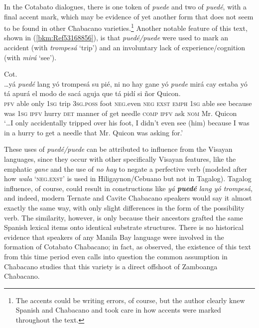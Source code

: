 \documentclass[output=paper,colorlinks,citecolor=brown]{langscibook}
\begin{document}
In the Cotabato dialogues, there is one token of \textit{puede} and two of \textit{puedé}, with a final accent mark, which may be evidence of yet another form that does not seem to be found in other Chabacano varieties.\footnote{The accents could be writing errors, of course, but the author clearly knew Spanish and Chabacano and took care in how accents were marked throughout the text.} Another notable feature of this text, shown in (\ref{bkm:Ref53168856}), is that \textit{puedé/puede} were used to mark an accident (with \textit{trompesá} ‘trip') and an involuntary lack of experience/cognition (with \textit{mirá} ‘see').

\ea
{\label{bkm:Ref53168856}Cot.}\\
\gll …yá \textit{puedé} lang yó trompesá su pié, ni no hay gane yó \textit{puede} mirá cay estaba yó tá apurá el modo de sacá aguja que tá pidí si ñor Quicon.\\
    \textsc{pfv} able only 1\textsc{sg} trip 3\textsc{sg.poss} foot \textsc{neg}.even \textsc{neg} \textsc{exst} \textsc{emph} 1\textsc{sg} able see because was 1\textsc{sg} \textsc{ipfv} hurry \textsc{det} manner of get needle \textsc{comp} \textsc{ipfv} ask \textsc{nom} Mr. Quicon\\
\glt `…I only accidentally tripped over his foot, I didn't even see (him) because I was in a hurry to get a needle that Mr. Quicon was asking for.' \citep[308]{Fernández2012elchab}
\z


These uses of \textit{puedé/puede} can be attributed to influence from the Visayan languages, since they occur with other specifically Visayan features, like the emphatic \textit{gane} and the use of \textit{no hay} to negate a perfective verb (modeled after how \textit{wala} ‘\textsc{neg.exst}’ is used in Hiligaynon/Cebuano but not in Tagalog). Tagalog influence, of course, could result in constructions like \textit{yá} \textbf{\textit{puedé}} \textit{lang yó trompesá}, and indeed, modern Ternate and Cavite Chabacano speakers would say it almost exactly the same way, with only slight differences in the form of the possibility verb. The similarity, however, is only because their ancestors grafted the same Spanish lexical items onto identical substrate structures. There is no historical evidence that speakers of any Manila Bay language were involved in the formation of Cotabato Chabacano; in fact, as \citet{Fernández2012elchab} observed, the existence of this text from this time period even calls into question the common assumption in Chabacano studies that this variety is a direct offshoot of Zamboanga Chabacano.  
\end{document}
